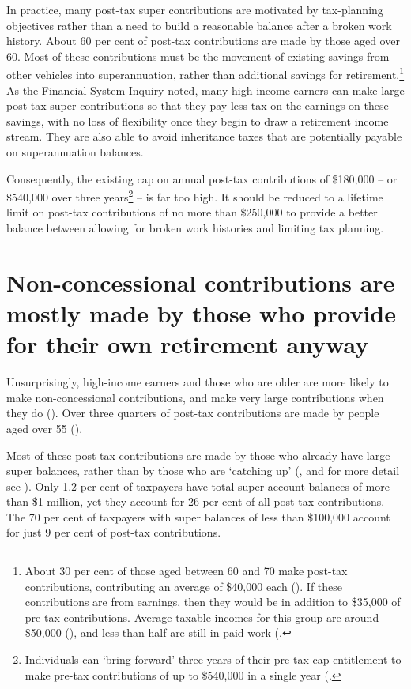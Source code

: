 \documentclass{grattanAlpha}
\begin{document}
In practice, many post-tax super contributions are motivated by tax-planning objectives rather than a need to build a reasonable balance after a broken work history. About 60 per cent of post-tax contributions are made by those aged over 60. Most of these contributions must be the movement of existing savings from other vehicles into superannuation, rather than additional savings for retirement.\footnote{About 30 per cent of those aged between 60 and 70 make post-tax contributions, contributing an average of \$40,000 each (). If these contributions are from earnings, then they would be in addition to \$35,000 of pre-tax contributions. Average taxable incomes for this group are around \$50,000 (\textcite{ATO2015SampleFile1213}), and less than half are still in paid work (\textcite[][58]{ProductivityCommission2013AgeingAustralia}.}  As the Financial System Inquiry noted, many high-income earners can make large post-tax super contributions so that they pay less tax on the earnings on these savings, with no loss of flexibility once they begin to draw a retirement income stream.  They are also able to avoid inheritance taxes that are potentially payable on superannuation balances.

Consequently, the existing cap on annual post-tax contributions of \$180,000 – or \$540,000 over three years\footnote{Individuals can ‘bring forward’ three years of their pre-tax cap entitlement to make pre-tax contributions of up to \$540,000 in a single year (\textcite{ATO2015SuperContr--too-much-super-can-mean-extra-tax}.} – is far too high.  It should be reduced to a lifetime limit on post-tax contributions of no more than \$250,000 to provide a better balance between allowing for broken work histories and limiting tax planning. 

\section{Non-concessional contributions are mostly made by those who provide for their own retirement anyway}\label{sec:SUPER-5-1}
Unsurprisingly, high-income earners and those who are older are more likely to make non-concessional contributions, and make very large contributions when they do (). Over three quarters of post-tax contributions are made by people aged over 55 (). 

Most of these post-tax contributions are made by those who already have large super balances, rather than by those who are ‘catching up’ (, and for more detail see ). Only 1.2 per cent of taxpayers have total super account balances of more than \$1 million, yet they account for 26 per cent of all post-tax contributions. The 70 per cent of taxpayers with super balances of less than \$100,000 account for just 9 per cent of post-tax contributions.  
\end{document}
